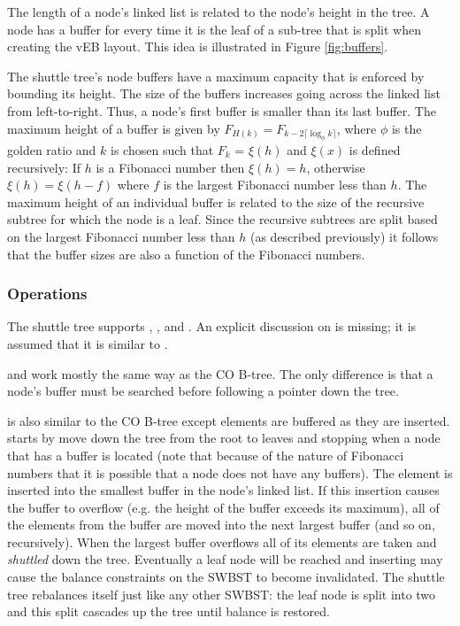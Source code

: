 \documentclass[preprint]{style}
\begin{document}
The length of a node's linked list is related to the node's height in the tree.
A node has a buffer for every time it is the leaf of a sub-tree that is split
when creating the vEB layout. This idea is illustrated in Figure
\ref{fig:buffers}.

The shuttle tree's node buffers have a maximum capacity that is enforced by
bounding its height. The size of the buffers increases going across the linked
list from left-to-right. Thus, a node's first buffer is smaller than its last
buffer. The maximum height of a buffer is given by $F_{H(k)} = F_{k-2 \lceil
\log_{\phi} k \rceil}$, where $\phi$ is the golden ratio and $k$ is chosen such
that $F_k$ = $\xi(h)$ and $\xi(x)$ is defined recursively: If $h$ is a
Fibonacci number then $\xi(h) = h$, otherwise $\xi(h) = \xi(h-f)$ where $f$ is
the largest Fibonacci number less than $h$. The maximum height of an individual
buffer is related to the size of the recursive subtree for which the node is a
leaf.  Since the recursive subtrees are split based on the largest Fibonacci
number less than $h$ (as described previously) it follows that the buffer sizes
are also a function of the Fibonacci numbers.

\subsubsection{Operations}

The shuttle tree supports \Search{}, \Insert{}, and \Scan{}. An explicit
discussion on \Delete{} is missing; it is assumed that it is similar 
to \Insert{}.

\Search{} and \Scan{} work mostly the same way as the CO B-tree. The only
difference is that a node's buffer must be searched before following a
pointer down the tree.

\Insert{} is also similar to the CO B-tree except elements are buffered as they
are inserted. \Insert{} starts by move down the tree from the root to leaves
and stopping when a node that has a buffer is located (note that because of the
nature of Fibonacci numbers that it is possible that a node does not have any
buffers). The element is inserted into the smallest buffer in the node's linked
list. If this insertion causes the buffer to overflow (e.g. the height of the
buffer exceeds its maximum), all of the elements from the buffer are moved into
the next largest buffer (and so on, recursively).  When the largest buffer
overflows all of its elements are taken and \textit{shuttled} down the tree.
Eventually a leaf node will be reached and inserting may cause the balance
constraints on the SWBST to become invalidated. The shuttle tree rebalances
itself just like any other SWBST: the leaf node is split into two and this
split cascades up the tree until balance is restored.
\end{document}
